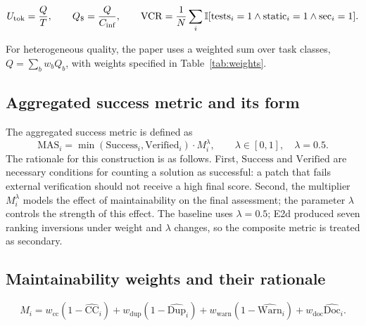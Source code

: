 \begin{align}
U_{\text{tok}}=\frac{Q}{T},\qquad Q_{\$}=\frac{Q}{C_{\text{inf}}},\qquad \mathrm{VCR}=\frac{1}{N}\sum_i\mathbb{I}[\text{tests}_i=1\land\text{static}_i=1\land\text{sec}_i=1].\label{eq:metrics-main}
\end{align}

For heterogeneous quality, the paper uses a weighted sum over task classes, $Q=\sum_b w_b Q_b$, with weights specified in Table~\ref{tab:weights}.

\subsection{Aggregated success metric and its form}

The aggregated success metric is defined as
\begin{equation}
\mathrm{MAS}_i=\min(\mathrm{Success}_i,\mathrm{Verified}_i)\cdot M_i^{\lambda},\qquad \lambda\in[0,1],\quad\lambda=0.5.
\label{eq:mas}
\end{equation}
The rationale for this construction is as follows. First, $\mathrm{Success}$ and $\mathrm{Verified}$ are necessary conditions for counting a solution as successful: a patch that fails external verification should not receive a high final score. Second, the multiplier $M_i^\lambda$ models the effect of maintainability on the final assessment; the parameter $\lambda$ controls the strength of this effect. The baseline uses $\lambda=0.5$; E2d produced seven ranking inversions under weight and $\lambda$ changes, so the composite metric is treated as secondary.

\subsection{Maintainability weights and their rationale}

\begin{equation}
M_i=w_{\mathrm{cc}}(1-\widehat{\mathrm{CC}}_i)+w_{\mathrm{dup}}(1-\widehat{\mathrm{Dup}}_i)+w_{\mathrm{warn}}(1-\widehat{\mathrm{Warn}}_i)+w_{\mathrm{doc}}\widehat{\mathrm{Doc}}_i.
\label{eq:maintainability}
\end{equation}

